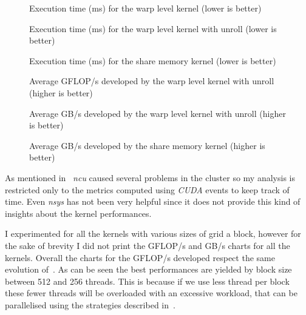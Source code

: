 \documentclass[conference]{IEEEtran}
\begin{document}
\begin{figure}[ht]
    \centering
    
    \caption{Execution time (ms) for the warp level kernel (lower is better)}
    \label{fig:avg-exec-time-warp}
  \end{figure}

\begin{figure}[ht]
    \centering
    
    \caption{Execution time (ms) for the warp level kernel with unroll (lower is better)}
    \label{fig:avg-exec-time-warp-unroll}
  \end{figure}

\begin{figure}[ht]
    \centering
    
    \caption{Execution time (ms) for the share memory kernel (lower is better)}
    \label{fig:avg-exec-time-share}
  \end{figure}

\begin{figure}[ht]
    \centering
    
    \caption{Average GFLOP/s developed by the warp level kernel with unroll (higher is better)}
    \label{fig:avg-gflop}
  \end{figure}

\begin{figure}[ht]
    \centering
    
    \caption{Average GB/s developed by the warp level kernel with unroll (higher is better)}
    \label{fig:avg-warp-unroll-gb}
  \end{figure}

  \begin{figure}[ht]
    \centering
    
    \caption{Average GB/s developed by the share memory kernel (higher is better)}
    \label{fig:avg-share-gb}
  \end{figure}
  
As mentioned in~ \emph{ncu} caused several problems in the cluster so my analysis is restricted only to the metrics computed using \emph{CUDA} events to keep track of time. Even \emph{nsys} has not been very helpful since it does not provide this kind of insights about the kernel performances. 
  
I experimented for all the kernels with various sizes of grid a block, however for the sake of brevity I did not print the GFLOP/s and GB/s charts for all the kernels. Overall the charts for the GFLOP/s developed respect the same evolution of~. As can be seen the best performances are yielded by block size between 512 and 256 threads. This is because if we use less thread per block these fewer threads will be overloaded with an excessive workload, that can be parallelised using the strategies described in~.
\end{document}
